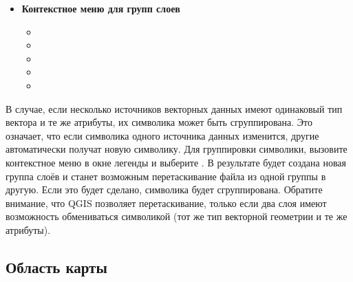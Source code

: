 \begin{itemize}
\item \textbf{Контекстное меню для групп слоев}
\begin{itemize}
\item {}
\item {}
\item {}
\item {}
\item {}
\end{itemize}

\end{itemize}

В случае, если несколько источников векторных данных имеют одинаковый
тип вектора и те же атрибуты, их символика может быть сгруппирована.
Это означает, что если символика одного источника данных изменится,
другие автоматически получат новую символику. Для группировки символики,
вызовите контекстное меню в окне легенды и выберите
. В результате будет создана новая группа слоёв
и станет возможным перетаскивание файла из одной группы в другую. Если это будет
сделано, символика будет сгруппирована. Обратите внимание, что QGIS
позволяет перетаскивание, только если два слоя имеют возможность
обмениваться символикой (тот же тип векторной геометрии и те же атрибуты).

%

\subsection{Область карты}\label{label_mapview}

